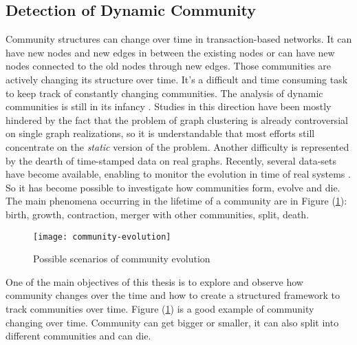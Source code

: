 \subsection{Detection of Dynamic Community}\label{subsub:dynamic_community}
Community structures can change over time in transaction-based networks. It can have new nodes and new edges in between the existing nodes or can have new nodes connected to the old nodes through new edges. Those communities are actively changing its structure over time. It's a difficult and time consuming task to keep track of constantly changing communities. The analysis of dynamic communities is still in its infancy \cite{ref-6}. Studies in this direction have been mostly hindered by the fact that the problem of graph clustering is already controversial on single graph realizations, so it is understandable that most efforts still concentrate on the \textit{static} version of the problem. Another difficulty is represented by the dearth of time-stamped data on real graphs. Recently, several data-sets have become available, enabling to monitor the evolution in time of real systems \cite{ref-23}. So it has become possible to investigate how communities form, evolve and die. The main phenomena occurring in the lifetime of a community are in Figure (\ref{fig:community-evolution}): birth, growth, contraction, merger with other communities, split, death.

\vfill
\pagebreak

\begin{figure}[!ht]
	\centering
	\texttt{[image: community-evolution]}
	\caption{Possible scenarios of community evolution \cite{ref-23}}
	\label{fig:community-evolution}
\end{figure}

One of the main objectives of this thesis is to explore and observe how community changes over the time and how to create a structured framework to track communities over time. Figure (\ref{fig:community-evolution}) is a good example of community changing over time. Community can get bigger or smaller, it can also split into different communities and can die.